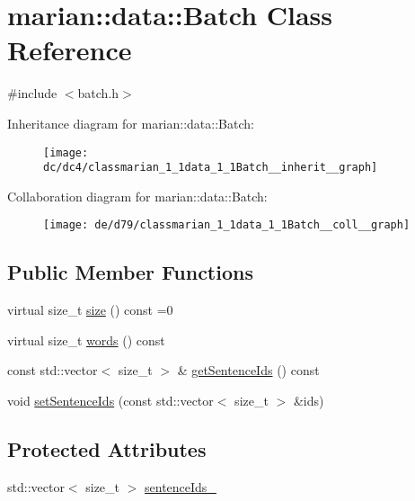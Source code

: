 \hypertarget{classmarian_1_1data_1_1Batch}{}\section{marian\+:\+:data\+:\+:Batch Class Reference}
\label{classmarian_1_1data_1_1Batch}


{\ttfamily \#include $<$batch.\+h$>$}



Inheritance diagram for marian\+:\+:data\+:\+:Batch\+:
\nopagebreak
\begin{figure}[H]
\begin{center}
\leavevmode
\texttt{[image: dc/dc4/classmarian\_1\_1data\_1\_1Batch\_\_inherit\_\_graph]}
\end{center}
\end{figure}


Collaboration diagram for marian\+:\+:data\+:\+:Batch\+:
\nopagebreak
\begin{figure}[H]
\begin{center}
\leavevmode
\texttt{[image: de/d79/classmarian\_1\_1data\_1\_1Batch\_\_coll\_\_graph]}
\end{center}
\end{figure}
\subsection*{Public Member Functions}
\begin{DoxyCompactItemize}
\item 
virtual size\+\_\+t \hyperlink{classmarian_1_1data_1_1Batch_a94c7526a079220adb07575e302c670c4}{size} () const =0
\item 
virtual size\+\_\+t \hyperlink{classmarian_1_1data_1_1Batch_add894ad400ec53d81b4a9950fe4b34b6}{words} () const 
\item 
const std\+::vector$<$ size\+\_\+t $>$ \& \hyperlink{classmarian_1_1data_1_1Batch_a97e46e2989b883d9bda1c53840ef5315}{get\+Sentence\+Ids} () const 
\item 
void \hyperlink{classmarian_1_1data_1_1Batch_a22fd2ded066b30034cc506849b0cc4c3}{set\+Sentence\+Ids} (const std\+::vector$<$ size\+\_\+t $>$ \&ids)
\end{DoxyCompactItemize}
\subsection*{Protected Attributes}
\begin{DoxyCompactItemize}
\item 
std\+::vector$<$ size\+\_\+t $>$ \hyperlink{classmarian_1_1data_1_1Batch_aeaa5d26797761e4e0abbe56cf2d89c3a}{sentence\+Ids\+\_\+}
\end{DoxyCompactItemize}


